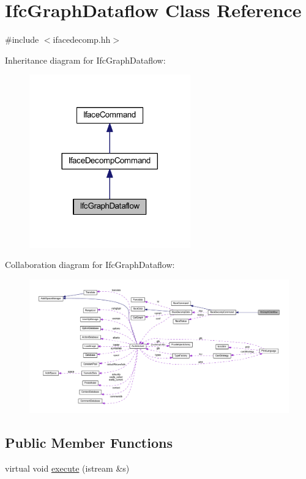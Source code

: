 \hypertarget{class_ifc_graph_dataflow}{}\section{Ifc\+Graph\+Dataflow Class Reference}
\label{class_ifc_graph_dataflow}


{\ttfamily \#include $<$ifacedecomp.\+hh$>$}



Inheritance diagram for Ifc\+Graph\+Dataflow\+:
\nopagebreak
\begin{figure}[H]
\begin{center}
\leavevmode
\includegraphics[width=197pt]{class_ifc_graph_dataflow__inherit__graph}
\end{center}
\end{figure}


Collaboration diagram for Ifc\+Graph\+Dataflow\+:
\nopagebreak
\begin{figure}[H]
\begin{center}
\leavevmode
\includegraphics[width=350pt]{class_ifc_graph_dataflow__coll__graph}
\end{center}
\end{figure}
\subsection*{Public Member Functions}
\begin{DoxyCompactItemize}
\item 
virtual void \mbox{\hyperlink{class_ifc_graph_dataflow_a5daf51e3a17da2d71241bbd1e900e8f7}{execute}} (istream \&s)
\end{DoxyCompactItemize}
